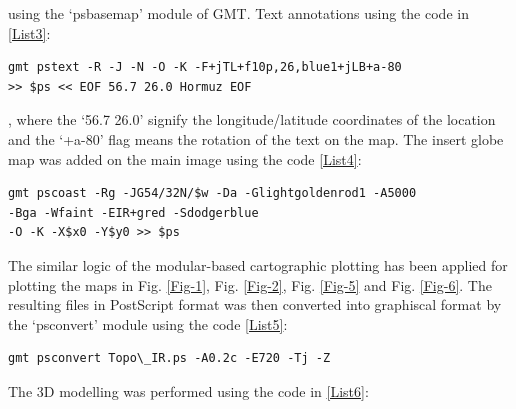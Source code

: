 \documentclass[12pt,a4paper,oneside]{article}
\begin{document}
using the ‘psbasemap’ module of GMT. Text annotations using the code in \ref{List3}: 

\begin{lstlisting}[frame=single]
gmt pstext -R -J -N -O -K -F+jTL+f10p,26,blue1+jLB+a-80 
>> $ps << EOF 56.7 26.0 Hormuz EOF
\end{lstlisting}

, where the ‘56.7 26.0’ signify the longitude/latitude coordinates of the location and the ‘+a-80’ flag means the rotation of the text on the map. The insert globe map was added on the main image using the code \ref{List4}: 

\begin{lstlisting}[frame=single]
gmt pscoast -Rg -JG54/32N/$w -Da -Glightgoldenrod1 -A5000 
-Bga -Wfaint -EIR+gred -Sdodgerblue 
-O -K -X$x0 -Y$y0 >> $ps
\end{lstlisting} 

The similar logic of the modular-based cartographic plotting has been applied for plotting the maps in Fig. \ref{Fig-1}, Fig. \ref{Fig-2}, Fig. \ref{Fig-5} and Fig. \ref{Fig-6}. The resulting files in PostScript format was then converted into graphiscal format by the ‘psconvert’ module using the code \ref{List5}: 

\begin{lstlisting}[frame=single]
gmt psconvert Topo\_IR.ps -A0.2c -E720 -Tj -Z
\end{lstlisting}

The 3D modelling was performed using the code in \ref{List6}:
\end{document}
